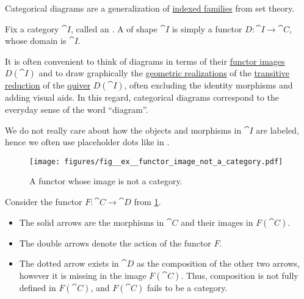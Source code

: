 \begin{definition}\label{def:categorical_diagram}
  Categorical diagrams are a generalization of \hyperref[def:tuple_and_cartesian_product/indexed_family]{indexed families} from set theory.

  Fix a category \( \cat{I} \), called an . A  of shape \( \cat{I} \) is simply a functor \( D: \cat{I} \to \cat{C} \), whose domain is \( \cat{I} \).

  It is often convenient to think of diagrams in terms of their \hyperref[def:functor_image]{functor images} \( D(\cat{I}) \) and to draw graphically the \hyperref[def:quiver_geometric_realization]{geometric realizations} of the \hyperref[def:quiver_transitive_closure]{transitive reduction} of the \hyperref[def:quiver]{quiver} \( D(\cat{I}) \), often excluding the identity morphisms and adding visual aids. In this regard, categorical diagrams correspond to the everyday sense of the word \enquote{diagram}.

  We do not really care about how the objects and morphisms in \( \cat{I} \) are labeled, hence we often use placeholder dots like in .
\end{definition}

\begin{example}\label{ex:functor_image_not_a_category}
  \begin{figure}
    \hfill
    \texttt{[image: figures/fig\_\_ex\_\_functor\_image\_not\_a\_category.pdf]}
    \hfill
    \hfill
    \caption{A functor whose image is not a category.}\label{fig:ex:functor_image_not_a_category}
  \end{figure}

  Consider the functor \( F: \cat{C} \to \cat{D} \) from \cref{fig:ex:functor_image_not_a_category}.

  \begin{itemize}
    \item The solid arrows are the morphisms in \( \cat{C} \) and their images in \( F(\cat{C}) \).
    \item The double arrows denote the action of the functor \( F \).
    \item The dotted arrow exists in \( \cat{D} \) as the composition of the other two arrows, however it is missing in the image \( F(\cat{C}) \). Thus, composition is not fully defined in \( F(\cat{C}) \), and \( F(\cat{C}) \) fails to be a category.
  \end{itemize}
\end{example}

